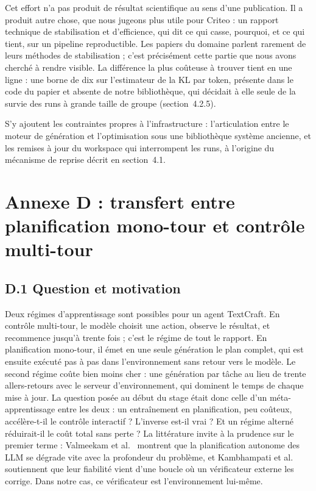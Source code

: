 \documentclass[11pt,a4paper]{article}
\begin{document}
Cet effort n'a pas produit de résultat scientifique au sens d'une publication. Il a produit autre chose, que nous jugeons plus utile pour Criteo : un rapport technique de stabilisation et d'efficience, qui dit ce qui casse, pourquoi, et ce qui tient, sur un pipeline reproductible. Les papiers du domaine parlent rarement de leurs méthodes de stabilisation ; c'est précisément cette partie que nous avons cherché à rendre visible. La différence la plus coûteuse à trouver tient en une ligne : une borne de dix sur l'estimateur de la KL par token, présente dans le code du papier et absente de notre bibliothèque, qui décidait à elle seule de la survie des runs à grande taille de groupe (section~4.2.5).


S'y ajoutent les contraintes propres à l'infrastructure : l'articulation entre le moteur de génération et l'optimisation sous une bibliothèque système ancienne, et les remises à jour du workspace qui interrompent les runs, à l'origine du mécanisme de reprise décrit en section~4.1.





\section{Annexe D : transfert entre planification mono-tour et contrôle multi-tour}
\label{annexe:transfert}

\subsection*{D.1 Question et motivation}
Deux régimes d'apprentissage sont possibles pour un agent TextCraft. En contrôle multi-tour, le modèle choisit une action, observe le résultat, et recommence jusqu'à trente fois ; c'est le régime de tout le rapport. En planification mono-tour, il émet en une seule génération le plan complet, qui est ensuite exécuté pas à pas dans l'environnement sans retour vers le modèle. Le second régime coûte bien moins cher : une génération par tâche au lieu de trente allers-retours avec le serveur d'environnement, qui dominent le temps de chaque mise à jour. La question posée au début du stage était donc celle d'un méta-apprentissage entre les deux : un entraînement en planification, peu coûteux, accélère-t-il le contrôle interactif ? L'inverse est-il vrai ? Et un régime alterné réduirait-il le coût total sans perte ? La littérature invite à la prudence sur le premier terme : Valmeekam et al.~\cite{valmeekam2023planning} montrent que la planification autonome des LLM se dégrade vite avec la profondeur du problème, et Kambhampati et al.~\cite{kambhampati2024llmmodulo} soutiennent que leur fiabilité vient d'une boucle où un vérificateur externe les corrige. Dans notre cas, ce vérificateur est l'environnement lui-même.
\end{document}
